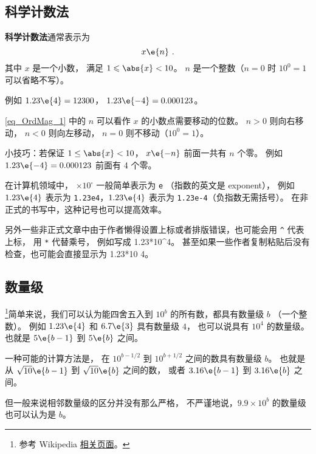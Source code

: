 
\subsection{科学计数法}
\textbf{科学计数法}通常表示为
\begin{equation}\label{eq_OrdMag_1}
x \e{n}~.
\end{equation}
其中 $x$ 是一个小数， 满足 $1 \leqslant \abs{x} < 10$。 $n$ 是一个整数（$n=0$ 时 $10^{0} = 1$ 可以省略不写）。

例如 $1.23\e{4} = 12300$， $1.23\e{-4} = 0.000123$。

\autoref{eq_OrdMag_1} 中的 $n$ 可以看作 $x$ 的小数点需要移动的位数。 $n > 0$ 则向右移动， $n < 0$ 则向左移动， $n=0$ 则不移动（$10^{0} = 1$）。

小技巧：若保证 $1 \le \abs{x} < 10$， $x\e{-n}$ 前面一共有 $n$ 个零。 例如 $1.23\e{-4} = 0.000123$ 前面有 4 个零。

在计算机领域中， $\times 10^\square$ 一般简单表示为 \verb`e` （指数的英文是 exponent）， 例如 $1.23\e{4}$ 表示为 \verb`1.23e4`，$1.23\e{4}$ 表示为 \verb`1.23e-4`（负指数无需括号）。 在非正式的书写中，这种记号也可以提高效率。

另外一些非正式文章中由于作者懒得设置上标或者排版错误，也可能会用 \verb`^` 代表上标， 用 \verb`*` 代替乘号， 例如写成 1.23*10^4。 甚至如果一些作者复制粘贴后没有检查，也可能会直接显示为 1.23*10 4。

\subsection{数量级}
\footnote{参考 Wikipedia \href{https://en.wikipedia.org/wiki/Order_of_magnitude}{相关页面}。}简单来说，我们可以认为能四舍五入到 $10^b$ 的所有数，都具有数量级 $b$ （一个整数）。 例如 $1.23\e{4}$ 和 $6.7\e{3}$ 具有数量级 $4$， 也可以说具有 $10^4$ 的数量级。 也就是 $5\e{b-1}$ 到 $5\e{b}$ 之间。

一种可能的计算方法是， 在 $10^{b-1/2}$ 到 $10^{b+1/2}$ 之间的数具有数量级 $b$。 也就是从 $\sqrt{10}\e{b-1}$ 到 $\sqrt{10}\e{b}$ 之间的数， 或者 $3.16\e{b-1}$ 到 $3.16\e{b}$ 之间。

但一般来说相邻数量级的区分并没有那么严格， 不严谨地说，$9.9\times 10^b$ 的数量级也可以认为是 $b$。
